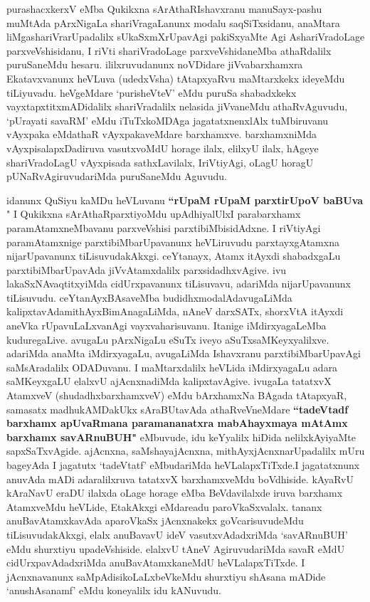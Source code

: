 \begin{artha}
purashacxkerxV eMba Qukikxna sArAthaR\ndash Ishavxranu manuSayx-pashu muMtAda pArxNigaLa shariVragaLanunx modalu saqSiTxsidanu, anaMtara liMgashariVrarUpadalilx sUkaSxmXrUpavAgi pakiSxyaMte Agi AshariVradoLage parxveVshisidanu, I riVti shariVradoLage parxveVshidaneMba athaRdalilx puruSaneMdu hesaru. ililxruvudanunx noVDidare jiVvabarxhamxra Ekatavxvanunx heVLuva (udedxVsha) tAtapxyaRvu maMtarxkekx ideyeMdu tiLiyuvadu. heVgeMdare `purisheVteV' eMdu puruSa shabadxkekx vayxtapxtitxmADidalilx shariVradalilx nelasida jiVvaneMdu athaRvAguvudu, `pUrayati savaRM' eMdu iTuTxkoMDAga jagatatxnenxlAlx tuMbiruvanu vAyxpaka eMdathaR vAyxpakaveMdare barxhamxve. barxhamxniMda vAyxpisalapxDadiruva vasutxvoMdU horage ilalx, elilxyU ilalx, hAgeye shariVradoLagU vAyxpisada sathxLavilalx, IriVtiyAgi, oLagU horagU pUNaRvAgiruvudariMda puruSaneMdu Aguvudu.  

idanunx QuSiyu kaMDu heVLuvanu \ndash \textbf{``rUpaM rUpaM parxtirUpoV baBUva}  \mdash  " I Qukikxna sArAthaR\ndash parxtiyoMdu upAdhiyalUlx\break I parabarxhamx paramAtamxneMbavanu parxveVshisi parxtibiMbisidAdxne. I riVtiyAgi paramAtamxnige parxtibiMbarUpavanunx heVLiruvudu parxtayxgAtamxna nijarUpavanunx tiLisuvudakAkxgi.  ceYtanayx, Atamx itAyxdi shabadxgaLu parxtibiMbarUpavAda jiVvAtamxdalilx parxsidadhxvAgive. ivu lakaSxNAvaqtitxyiMda cidUrxpavanunx tiLisuvavu, adariMda nijarUpavanunx tiLisuvudu. ceYtanAyxBAsaveMba budidhxmodalAdavugaLiMda kalipxtavAda\break mithAyxBimAnagaLiMda, nAneV darxSATx, shorxVtA itAyxdi aneVka rUpavuLaLxvanAgi vayxvaharisuvanu. Itanige iMdirxyagaLeMba kuduregaLive. avugaLu pArxNigaLu eSuTx iveyo aSuTxsaMKeyxyalilxve. adariMda anaMta iMdirxyagaLu, avugaLiMda Ishavxranu parxtibiMbarUpavAgi saMsAradalilx ODADuvanu. I maMtarxdalilx heVLida iMdirxyagaLu adara saMKeyxgaLU elalxvU ajAcnxnadiMda kalipxtavAgive. ivugaLa tatatxvX AtamxveV (shudadhxbarxhamxveV) eMdu bArxhamxNa BAgada tAtapxyaR, samasatx madhukAMDakUkx sAraBUtavAda athaRveVneMdare \textbf{``tadeVtadf barxhamx apUvaRmana paramananatxra mabAhayxmaya mAtAmx barxhamx savARnuBUH"} eMbuvude, idu keYyalilx hiDida nelilxkAyiyaMte sapxSaTxvAgide. ajAcnxna, saMshayajAcnxna, mithAyxjAcnxnarUpadalilx mUru bageyAda I jagatutx `tadeVtatf' eMbudariMda heVLalapxTiTxde.\break I jagatatxnunx anuvAda mADi adaralilxruva tatatxvX barxhamxveMdu boVdhiside. kAyaRvU kAraNavU eraDU ilalxda oLage horage eMba BeVdavilalxde iruva barxhamx AtamxveMdu heVLide, EtakAkxgi eMdare\ndash adu paroVkaSxvalalx. tananx anuBavAtamxkavAda aparoVkaSx jAcnxnakekx goVcarisuvudeMdu tiLisuvudakAkxgi, elalx anuBavavU ideV vasutxvAdadxriMda `savARnuBUH' eMdu shurxtiyu upadeVshiside. elalxvU tAneV AgiruvudariMda savaR eMdU cidUrxpavAdadxriMda anuBavAtamxkaneMdU heVLalapxTiTxde. I jAcnxnavanunx saMpAdisikoLaLxbeVkeMdu shurxtiyu shAsana mADide `anushAsanamf' eMdu koneyalilx idu kANuvudu.
\end{artha}

